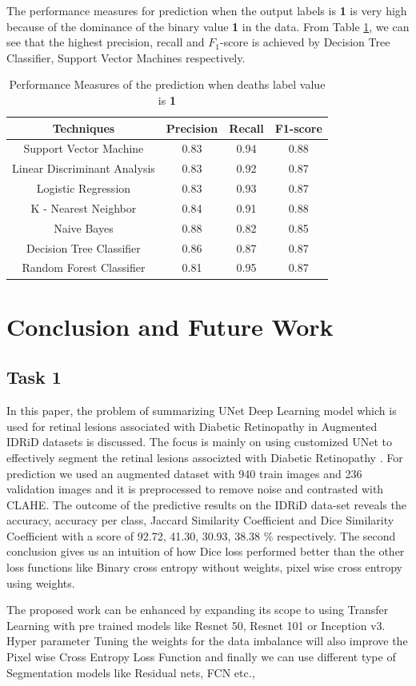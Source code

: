 \documentclass[conference]{IEEEtran}
\begin{document}
The performance measures for prediction when the output labels is \textbf{1} is very high because of the dominance of the binary value \textbf{1} in the data. From Table \ref{table:3}, we can see that the highest precision, recall and $F_1$-score is achieved by Decision Tree Classifier, Support Vector Machines respectively. 
\begin{table}[H]
\centering
 \begin{tabular}{|c| c c c|} 
 \hline
 Techniques  & Precision & Recall & F1-score \\ [0.5ex] 
 \hline
 Support Vector Machine & 0.83 & 0.94 & 0.88 \\ 
 \hline
 Linear Discriminant Analysis & 0.83 & 0.92 & 0.87\\
 \hline
 Logistic Regression & 0.83 & 0.93 & 0.87\\
 \hline
 K - Nearest Neighbor & 0.84 & 0.91 & 0.88\\
 \hline
 Naive Bayes & 0.88 & 0.82 & 0.85\\  
 \hline
 Decision Tree Classifier & 0.86 & 0.87 & 0.87 \\
 \hline
 Random Forest Classifier & 0.81 & 0.95 & 0.87  \\[0.75ex] 
 \hline
\end{tabular}
\vspace*{0.25cm}
\caption{Performance Measures of the prediction when deaths label value is \textbf{1}}
\label{table:3}
\end{table}


\section{Conclusion and Future Work}
\subsection{Task 1}
In this paper, the problem of summarizing UNet Deep Learning model which is used for retinal lesions associated with Diabetic Retinopathy in Augmented IDRiD datasets is discussed. The focus is mainly on using customized UNet to effectively segment the retinal lesions associzted with Diabetic Retinopathy \cite{monoclonal1} . For prediction we used an augmented dataset with 940 train images and 236 validation images and it is preprocessed to remove noise and contrasted with CLAHE. The outcome of the predictive results on the IDRiD data-set reveals the accuracy, accuracy per class, Jaccard Similarity Coefficient and Dice Similarity Coefficient with a score of 92.72, 41.30, 30.93, 38.38 \% respectively. The second conclusion gives us an intuition of how Dice loss performed better than the other loss functions like Binary cross entropy without weights, pixel wise cross entropy using weights.
\par 
The proposed work can be enhanced by expanding its scope to using Transfer Learning with pre trained models like Resnet 50, Resnet 101 or Inception v3. Hyper parameter Tuning the weights for the data imbalance will also improve the Pixel wise Cross Entropy Loss Function and finally we can use different type of Segmentation models like Residual nets, FCN etc.,
\end{document}

